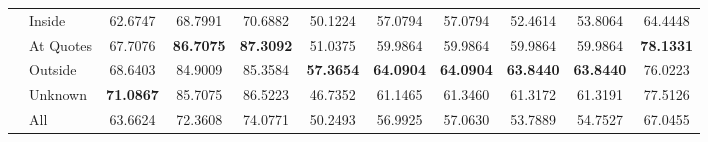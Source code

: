 \begin{table}
\begin{tabular}{llSSSSSSSSS}
 & Inside & 62.6747 & 68.7991 & 70.6882 & 50.1224 & 57.0794 & 57.0794 & 52.4614 & 53.8064 & 64.4448 \\
 & At Quotes & 67.7076 & \bfseries 86.7075 & \bfseries 87.3092 & 51.0375 & 59.9864 & 59.9864 & 59.9864 & 59.9864 & \bfseries 78.1331 \\
 & Outside & 68.6403 & 84.9009 & 85.3584 & \bfseries 57.3654 & \bfseries 64.0904 & \bfseries 64.0904 & \bfseries 63.8440 & \bfseries 63.8440 & 76.0223 \\
 & Unknown & \bfseries 71.0867 & 85.7075 & 86.5223 & 46.7352 & 61.1465 & 61.3460 & 61.3172 & 61.3191 & 77.5126 \\
 & All & 63.6624 & 72.3608 & 74.0771 & 50.2493 & 56.9925 & 57.0630 & 53.7889 & 54.7527 & 67.0455 \\
\bottomrule
\end{tabular}
\end{table}
